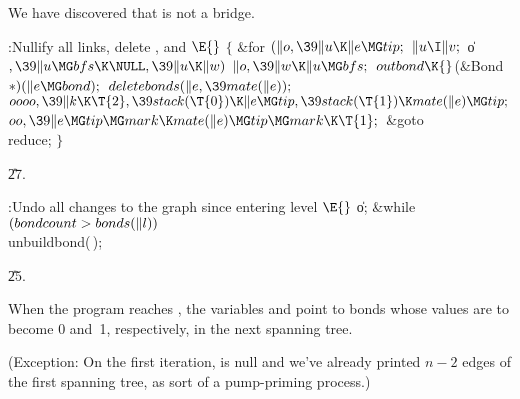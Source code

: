 We have discovered that  is not a bridge.

\Y\B\4:Nullify all  links, delete , and \X${}\E{}$\6
${}\{{}$\1\6
\&{for} ${}(\|o,\39\|u\K\|e\MG\\{tip};{}$ ${}\|u\I\|v;{}$ \|o${},\39\|u\MG%
\\{bfs}\K\NULL,\39\|u\K\|w){}$\1\5
${}\|o,\39\|w\K\|u\MG\\{bfs};{}$\2\6
${}\\{outbond}\K{}$(\&{Bond} ${}{*})(\|e\MG\\{bond});{}$\6
${}\\{deletebonds}(\|e,\39\\{mate}(\|e));{}$\6
${}\\{oooo},\39\|k\K\T{2},\39\\{stack}(\T{0})\K\|e\MG\\{tip},\39\\{stack}(%
\T{1})\K\\{mate}(\|e)\MG\\{tip};{}$\6
${}\\{oo},\39\|e\MG\\{tip}\MG\\{mark}\K\\{mate}(\|e)\MG\\{tip}\MG\\{mark}\K%
\T{1};{}$\6
\&{goto} \\{reduce};\6
\4${}\}{}$\2\par
\U27.\fi

\B{}:Undo all changes to the graph since entering level \X${}%
\E{}$\6
\|o;\5
\&{while} ${}(\\{bondcount}>\\{bonds}(\|l)){}$\1\5
\\{unbuildbond}(\,);\2\par
\U25.\fi

When the program reaches , the variables 
and  point to bonds whose values are to become 0 and~1,
respectively, in the next spanning tree.

(Exception: On the first
iteration,  is null and we've already printed $n-2$ edges
of the first spanning tree, as sort of a pump-priming process.)

